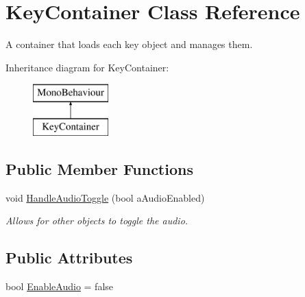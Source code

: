 \hypertarget{class_key_container}{}\section{Key\+Container Class Reference}
\label{class_key_container}


A container that loads each key object and manages them.  


Inheritance diagram for Key\+Container\+:\begin{figure}[H]
\begin{center}
\leavevmode
\includegraphics[height=2.000000cm]{class_key_container}
\end{center}
\end{figure}
\subsection*{Public Member Functions}
\begin{DoxyCompactItemize}
\item 
void \hyperlink{group___key_contain_handlers_ga5fc6752f438bda64f0f860da0788fc13}{Handle\+Audio\+Toggle} (bool a\+Audio\+Enabled)
\begin{DoxyCompactList}\small\item\em Allows for other objects to toggle the audio. \end{DoxyCompactList}\end{DoxyCompactItemize}
\subsection*{Public Attributes}
\begin{DoxyCompactItemize}
\item 
bool \hyperlink{group___key_contain_pub_var_ga5dc9b1349f8fafc894c7f739f6780a8c}{Enable\+Audio} = false
\end{DoxyCompactItemize}
